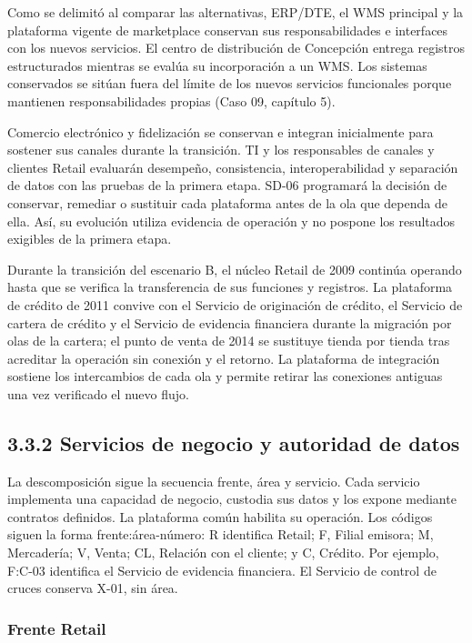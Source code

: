 \documentclass[11pt]{article}
\begin{document}
{Como se delimitó al comparar las alternativas, ERP/DTE, el WMS principal y la plataforma vigente de marketplace conservan sus responsabilidades e interfaces con los nuevos servicios. El centro de distribución de Concepción entrega registros estructurados mientras se evalúa su incorporación a un WMS. Los sistemas conservados se sitúan fuera del límite de los nuevos servicios funcionales porque mantienen responsabilidades propias (Caso 09, capítulo 5).}

{Comercio electrónico y fidelización se conservan e integran inicialmente para sostener sus canales durante la transición. TI y los responsables de canales y clientes Retail evaluarán desempeño, consistencia, interoperabilidad y separación de datos con las pruebas de la primera etapa. SD-06 programará la decisión de conservar, remediar o sustituir cada plataforma antes de la ola que dependa de ella. Así, su evolución utiliza evidencia de operación y no pospone los resultados exigibles de la primera etapa.}

{Durante la transición del escenario B, el núcleo Retail de 2009 continúa operando hasta que se verifica la transferencia de sus funciones y registros. La plataforma de crédito de 2011 convive con el Servicio de originación de crédito, el Servicio de cartera de crédito y el Servicio de evidencia financiera durante la migración por olas de la cartera; el punto de venta de 2014 se sustituye tienda por tienda tras acreditar la operación sin conexión y el retorno. La plataforma de integración sostiene los intercambios de cada ola y permite retirar las conexiones antiguas una vez verificado el nuevo flujo.}

\subsection{3.3.2 Servicios de negocio y autoridad de datos}

{La descomposición sigue la secuencia frente, área y servicio. Cada servicio implementa una capacidad de negocio, custodia sus datos y los expone mediante contratos definidos. La plataforma común habilita su operación. Los códigos siguen la forma frente:área-número: R identifica Retail; F, Filial emisora; M, Mercadería; V, Venta; CL, Relación con el cliente; y C, Crédito. Por ejemplo, F:C-03 identifica el Servicio de evidencia financiera. El Servicio de control de cruces conserva X-01, sin área.}

\subsubsection{Frente Retail}
\end{document}
